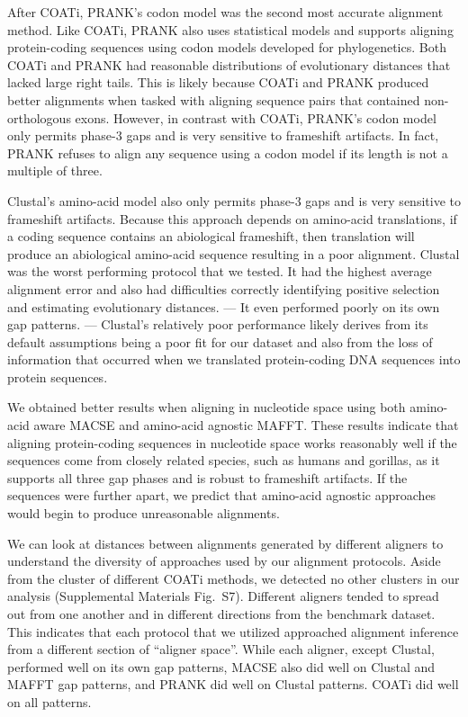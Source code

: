 \documentclass[12pt,letterpaper]{article}
\begin{document}
After COATi, PRANK's codon model was the second most accurate alignment method. Like COATi, PRANK also uses statistical models and supports aligning protein-coding sequences using codon models developed for phylogenetics. Both COATi and PRANK had reasonable distributions of evolutionary distances that lacked large right tails. This is likely because COATi and PRANK produced better alignments when tasked with aligning sequence pairs that contained non-orthologous exons. However, in contrast with COATi, PRANK's codon model only permits phase-3 gaps and is very sensitive to frameshift artifacts. In fact, PRANK refuses to align any sequence using a codon model if its length is not a multiple of three.

Clustal\textOmega{}'s amino-acid model also only permits phase-3 gaps and is very sensitive to frameshift artifacts. Because this approach depends on amino-acid translations, if a coding sequence contains an abiological frameshift, then translation will produce an abiological amino-acid sequence resulting in a poor alignment. Clustal\textOmega{} was the worst performing protocol that we tested. It had the highest average alignment error and also had difficulties correctly identifying positive selection and estimating evolutionary distances.  --- It even performed poorly on its own gap patterns. --- Clustal\textOmega{}'s relatively poor performance likely derives from its default assumptions being a poor fit for our dataset and also from the loss of information that occurred when we translated protein-coding DNA sequences into protein sequences.

We obtained better results when aligning in nucleotide space using both amino-acid aware MACSE and amino-acid agnostic MAFFT. These results indicate that aligning protein-coding sequences in nucleotide space works reasonably well if the sequences come from closely related species, such as humans and gorillas, as it supports all three gap phases and is robust to frameshift artifacts. If the sequences were further apart, we predict that amino-acid agnostic approaches would begin to produce unreasonable alignments. 

We can look at distances between alignments generated by different aligners to understand the diversity of approaches used by our alignment protocols. Aside from the cluster of different COATi methods, we detected no other clusters in our analysis (Supplemental Materials Fig.~S7). Different aligners tended to spread out from one another and in different directions from the benchmark dataset. This indicates that each protocol that we utilized approached alignment inference from a different section of ``aligner space''. While each aligner, except Clustal\textOmega{}, performed well on its own gap patterns, MACSE also did well on Clustal\textOmega{} and MAFFT gap patterns, and PRANK did well on Clustal\textOmega{} patterns. COATi did well on all patterns.
\end{document}
